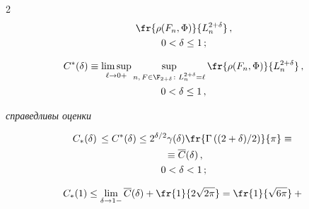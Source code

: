 \begin{multicols}{2}
\begin{multline*}
\fr{\rho(F_n,\Phi)}{L_n^{2+\delta}}\,,\\


 0<\delta \le 1\,;


\end{multline*}





\vspace*{-12pt}





\noindent


\begin{multline*}


C^*(\delta)\equiv \limsup_{\ell\to0+}\sup_{n,\,F\in\F_{2+\delta}\colon


L_n^{2+\delta}=\ell}\fr{ \rho(F_n,\Phi)}{L_n^{2+\delta}}\,,\\


 0<\delta\le1\,,


\end{multline*}


\textit{справедливы оценки}





\noindent


\begin{multline*}


C_*(\delta)\,\le C^*(\delta) \le


2^{\delta/2}\gamma(\delta)\fr{\Gamma\left((2+\delta)/2\right)}{\pi}\equiv{}\\


{}\equiv 


\overline{C}(\delta)\,,\\


 0<\delta < 1\,;


\end{multline*}





\vspace*{-12pt}





\noindent


\begin{multline*}


C_*(1) \le \lim_{\delta\to1-}\overline{C}(\delta)+\fr{1}{2\sqrt{2\pi}}=


\fr{1}{\sqrt{6\pi}}+{}\\



\end{multline*}
\end{multicols}
